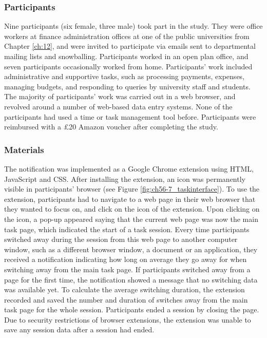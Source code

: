 \subsubsection{Participants}
Nine participants (six female, three male) took part in the study. They were office workers at finance administration offices at one of the public universities from Chapter \ref{ch:12}, and were invited to participate via emails sent to departmental mailing lists and snowballing. Participants worked in an open plan office, and seven participants occasionally worked from home. Participants’ work included administrative and supportive tasks, such as processing payments, expenses, managing budgets, and responding to queries by university staff and students. The majority of participants' work was carried out in a web browser, and revolved around a number of web-based data entry systems. None of the participants had used a time or task management tool before. Participants were reimbursed with a  \pounds 20 Amazon voucher after completing the study. 


\subsubsection{Materials}
The notification was implemented as a Google Chrome extension using HTML, JavaScript and CSS. After installing the extension, an icon was permanently visible in participants’ browser (see Figure \ref{fig:ch56-7_taskinterface}). To use the extension, participants had to navigate to a web page in their web browser that they wanted to focus on, and click on the icon of the extension. Upon clicking on the icon, a pop-up appeared saying that the current web page was now the main task page, which indicated the start of a task session. Every time participants switched away during the session from this web page to another computer window, such as a different browser window, a document or an application, they received a notification indicating how long on average they go away for when switching away from the main task page. If participants switched away from a page for the first time, the notification showed a message that no switching data was available yet. To calculate the average switching duration, the extension recorded and saved the number and duration of switches away from the main task page for the whole session. Participants ended a session by closing the page. Due to security restrictions of browser extensions, the extension was unable to save any session data after a session had ended. 

